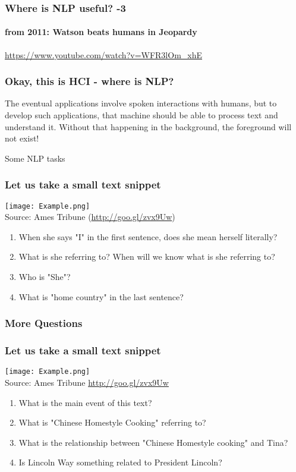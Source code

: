 \documentclass{beamer}
\begin{document}
\begin{frame}
\frametitle{Where is NLP useful? -3}
\framesubtitle{from 2011: Watson beats humans in Jeopardy}
\url{https://www.youtube.com/watch?v=WFR3lOm_xhE}
\end{frame}

\begin{frame}
\frametitle{Okay, this is HCI - where is NLP?}
The eventual applications involve spoken interactions with humans, but to develop such applications, that machine should be able to process text and understand it. Without that happening in the background, the foreground will not exist!
\end{frame}

\begin{frame}
\begin{center}
\Large Some NLP tasks 
\end{center}
\end{frame}

\begin{frame}
\frametitle{Let us take a small text snippet}
\texttt{[image: Example.png]}
\\ \footnotesize{Source: Ames Tribune (\url{http://goo.gl/zvx9Uw})}

\begin{enumerate}
\item When she says "I" in the first sentence, does she mean herself literally? \pause
\item What is she referring to? When will we know what is she referring to? \pause
\item Who is "She"? \pause
\item What is "home country" in the last sentence?  
\end{enumerate}
\end{frame}

\begin{frame}
\frametitle{More Questions}
\frametitle{Let us take a small text snippet}
\texttt{[image: Example.png]}
\\ \footnotesize{Source: Ames Tribune \url{http://goo.gl/zvx9Uw}}
\begin{enumerate}
\item What is the main event of this text? \pause
\item What is "Chinese Homestyle Cooking" referring to? \pause
\item What is the relationship between "Chinese Homestyle cooking" and Tina? \pause
\item Is Lincoln Way something related to President Lincoln?
\end{enumerate}
\end{frame}
\end{document}
